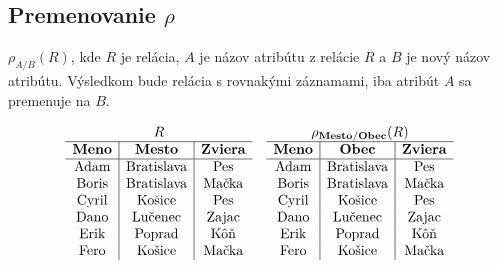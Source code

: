 \subsection*{\textbf{Premenovanie $\rho$}} $\rho_{A/ B} (R)$, kde $R$ je relácia, $A$ je názov
atribútu z relácie $R$ a $B$ je nový názov atribútu. Výsledkom bude relácia s rovnakými záznamami,
iba atribút $A$ sa premenuje na $B$.
    \begin{priklad}
    \begin{center}
        \[
        \begin{array}{c c}
            \begin{array}{c|c|c}
            \multicolumn{3}{c}{R} \\ \hline
            \textbf{Meno} & \textbf{Mesto}    & \textbf{Zviera} \\ \hline
            \text{Adam}   & \text{Bratislava} & \text{Pes} \\
            \text{Boris}  & \text{Bratislava} & \text{Mačka} \\
            \text{Cyril}  & \text{Košice}     & \text{Pes} \\
            \text{Dano}   & \text{Lučenec}    & \text{Zajac} \\
            \text{Erik}   & \text{Poprad}     & \text{Kôň} \\
            \text{Fero}   & \text{Košice}     & \text{Mačka} \\
            \end{array}
            &
            \begin{array}{c|c|c}
            \multicolumn{3}{c}{\rho_{\textbf{Mesto} / \textbf{Obec}}(R)} \\ \hline
            \textbf{Meno} & \textbf{Obec}     & \textbf{Zviera} \\ \hline
            \text{Adam}   & \text{Bratislava} & \text{Pes} \\
            \text{Boris}  & \text{Bratislava} & \text{Mačka} \\
            \text{Cyril}  & \text{Košice}     & \text{Pes} \\
            \text{Dano}   & \text{Lučenec}    & \text{Zajac} \\
            \text{Erik}   & \text{Poprad}     & \text{Kôň} \\
            \text{Fero}   & \text{Košice}     & \text{Mačka} \\
            \end{array}
        \end{array}
        \]
    \end{center}
    \end{priklad}
    
